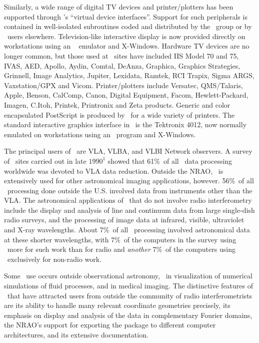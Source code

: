     Similarly, a wide range of digital TV devices and printer/plotters
has been supported through \AIPS's ``virtual device interfaces''.
Support for such peripherals is contained in well-isolated subroutines
coded and distributed by the \AIPS\ group or by \AIPS\
users elsewhere.  Television-like interactive display is now provided
directly on workstations using an \AIPS\ \indx{television} emulator
and X-Windows.  Hardware TV devices are no longer common, but those
used at \AIPS\ sites have included IIS Model 70 and 75, IVAS, AED,
Apollo, Aydin, Comtal, DeAnza, Graphica, Graphics Strategies,
Grinnell, Image Analytics, Jupiter, Lexidata, Ramtek, RCI Trapix,
Sigma ARGS, Vaxstation/GPX and Vicom.   Printer/plotters include
Versatec, QMS/Talaris, Apple, Benson, CalComp, Canon, Digital
Equipment, Facom, Hewlett-Packard, Imagen, C.Itoh, Printek, Printronix
and Zeta products.  Generic and color encapsulated PostScript is
produced by \AIPS\ for a wide variety of printers.  The standard
interactive graphics interface in \AIPS\ is the Tektronix 4012, now
normally emulated on workstations using an \AIPS\ program and
X-Windows.

    The principal users of \AIPS\ are VLA, VLBA, and VLBI Network
observers.  A survey of \AIPS\ sites carried out in late $1990^1$
showed that 61\%\ of all \AIPS\ data processing worldwide was devoted to
VLA data reduction.  Outside the NRAO, \AIPS\ is extensively used for
other astronomical imaging applications, however.  56\%\ of all \AIPS\
processing done outside the U.S. involved data from instruments other
than the VLA\@.  The astronomical applications of \AIPS\ that do not
involve radio interferometry include the display and analysis of line
and continuum data from large single-dish radio surveys, and the
processing of image data at infrared, visible, ultraviolet and X-ray
wavelengths.  About 7\%\ of all \AIPS\ processing involved astronomical
data at these shorter wavelengths, with 7\%\ of the computers in the
survey using \AIPS\ more for such work than for radio and {\it
another\/} 7\%\ of the computers using \AIPS\ exclusively for
non-radio work.

    Some \AIPS\ use occurs outside observational astronomy, \eg\ in
visualization of numerical simulations of fluid processes, and in
medical imaging.  The distinctive features of \AIPS\ that have attracted
users from outside the community of radio interferometrists are its
ability to handle many relevant coordinate geometries precisely, its
emphasis on display and analysis of the data in complementary Fourier
domains, the NRAO's support for exporting the package to different
computer architectures, and its extensive documentation.

